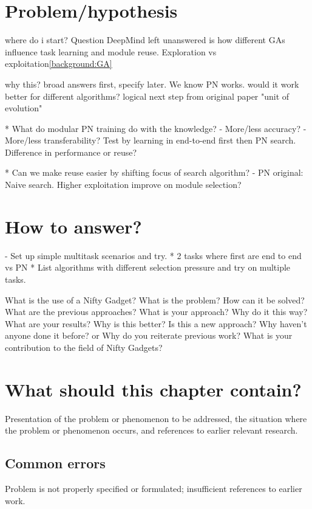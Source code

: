 \iffalse
\section{Problem/hypothesis}

where do i start?
Question DeepMind left unanswered is how different GAs influence task learning and module reuse. 
Exploration vs exploitation\ref{background:GA}

why this? broad answers first, specify later. 
We know PN works. would it work better for different algorithms?
logical next step from original paper "unit of evolution"




* What do modular PN training do with the knowledge? 
- More/less accuracy?
- More/less transferability? 
Test by learning in end-to-end first then PN search. 
Difference in performance or reuse?

* Can we make reuse easier by shifting focus of search algorithm?
- PN original: Naive search. Higher exploitation improve on module selection?

\section{How to answer?}
- Set up simple multitask scenarios and try. 
* 2 tasks where first are end to end vs PN
* List algorithms with different selection pressure and try on multiple tasks. 


    What is the use of a Nifty Gadget? 
    What is the problem? 
    How can it be solved? 
    What are the previous approaches? 
    What is your approach? 
    Why do it this way? 
    What are your results? 
    Why is this better? 
    Is this a new approach? 
    Why haven't anyone done it before? 
    or
    Why do you reiterate previous work? 
    What is your contribution to the field of Nifty Gadgets? 
    
    \section{What should this chapter contain?}
    Presentation of the problem or phenomenon to be addressed, the situation where the problem or phenomenon occurs, and references to earlier relevant research. 
    \subsection{Common errors}
    Problem is not properly specified or formulated; insufficient references to earlier work.  
    
